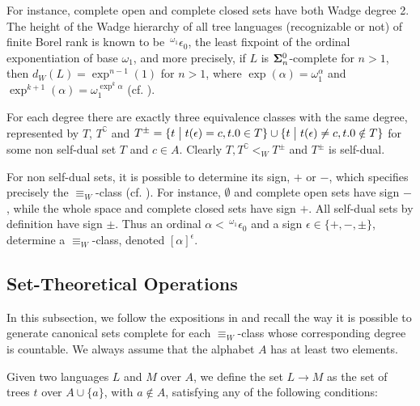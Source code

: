 For instance, complete open and complete closed sets have both Wadge degree 2. %
The
height of the Wadge hierarchy of all tree languages (recognizable or
not) of finite Borel rank is known to be $\,{}^{\omega_1} \epsilon_0$, 
the least fixpoint of the 
ordinal exponentiation of base $\omega_1$, and more precisely, if $L$ is ${\bf
  \Sigma}^0_n$-complete for $n>1$, then $d_W(L) = \exp^{n-1}(1)$ for $n>1$, where $\exp(\alpha) = \omega_1^\alpha$ and $\exp^{k+1}(\alpha) = \omega_1^{\exp^k{\alpha}}$ (cf. \cite{dup1}).

For each degree there are exactly three equivalence
classes with the same degree, represented by $T$, $T^\complement$ and
$T^\pm = \{t \bigm | t(\epsilon) = c, t.0\in T \} \cup  \{t \bigm |
t(\epsilon) \neq c, t.0\notin T \}$ for some non self-dual set $T$ and
$c\in A$. Clearly $T, T^\complement <_W T^\pm$ and
$T^\pm$ is self-dual.

For non self-dual sets, it is possible to determine its sign, $+$
or $-$, which specifies precisely the $\equiv_W$-class
(cf. \cite{dup1}). 
For instance, $\emptyset$ and complete open sets have sign $-$, while the whole space and complete closed  sets have sign $+$.
  All self-dual sets by
definition have sign $\pm$. Thus an ordinal $\alpha <\,
{}^{\omega_1}\epsilon_0$ and a sign $\epsilon \in \{+,-,\pm\}$,
determine a $\equiv_W$-class, denoted  $[\alpha]^\epsilon$. 



\subsection{Set-Theoretical Operations}
In this subsection, we follow the expositions in \cite{dup1,dup3} and recall the way it is possible to generate canonical sets complete for each $\equiv_W$-class whose corresponding degree is countable. We always assume that the alphabet $A$ has at least two elements.

\vspace{0.2cm}
Given two languages $L$ and $M$ over $A$, we define
 the set $L \to M$ as the set of trees $t$ over $A \cup\{a\}$, with $a \notin A$, satisfying any of the following conditions:

